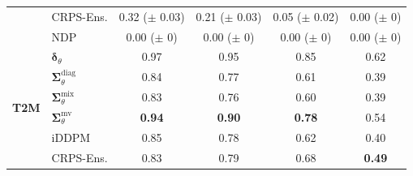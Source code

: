 \begin{tabular}{|l|l|cccc|}
        & CRPS-Ens. & \makecell{0.32 \\ ($\pm$ 0.03)} & \makecell{0.21 \\ ($\pm$ 0.03)} & \makecell{0.05 \\ ($\pm$ 0.02)} & \makecell{0.00 \\ ($\pm$ 0)} \\
        & NDP & \makecell{0.00 \\ ($\pm$ 0)} & \makecell{0.00 \\ ($\pm$ 0)} & \makecell{0.00 \\ ($\pm$ 0)} & \makecell{0.00 \\ ($\pm$ 0)} \\
        \midrule
        \multirow{6}{*}{\textbf{T2M}}
        & $\bm\delta_\theta$ & 0.97 & 0.95 & 0.85 & 0.62 \\
        & $\bm\Sigma_\theta^{\mathrm{diag}}$ & 0.84 & 0.77 & 0.61 & 0.39 \\
        & $\bm\Sigma_\theta^{\mathrm{mix}}$ & 0.83 & 0.76 & 0.60 & 0.39 \\
        & $\bm\Sigma_\theta^{\mathrm{mv}}$ & \textbf{0.94} & \textbf{0.90} & \textbf{0.78} & 0.54 \\
        & iDDPM & 0.85 & 0.78 & 0.62 & 0.40 \\
        & CRPS-Ens. & 0.83 & 0.79 & 0.68 & \textbf{0.49} \\
        \bottomrule
    \end{tabular}
